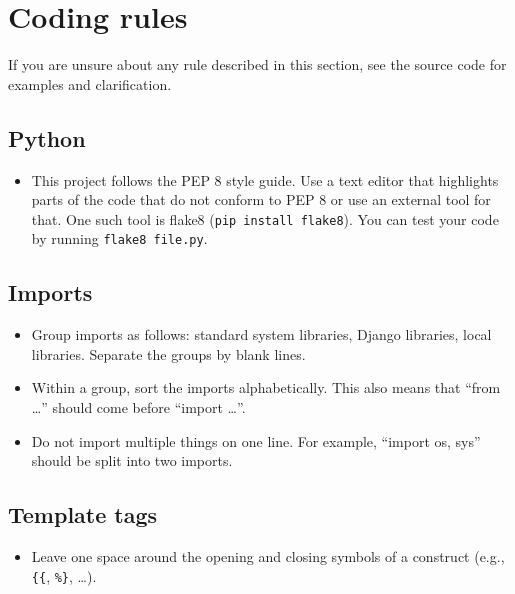 \documentclass{article}
\begin{document}
\section{Coding rules}

If you are unsure about any rule described in this section, see the source code for examples and clarification.

\subsection{Python}

\begin{itemize}
\item This project follows the PEP 8 style guide. Use a text editor that highlights parts of the code that do not conform to PEP 8 or use an external tool for that. One such tool is flake8 (\texttt{pip install flake8}). You can test your code by running \texttt{flake8 file.py}.
\end{itemize}

\subsection{Imports}

\begin{itemize}
\item Group imports as follows: standard system libraries, Django libraries, local libraries. Separate the groups by blank lines.
\item Within a group, sort the imports alphabetically. This also means that ``from \ldots'' should come before ``import \ldots''.
\item Do not import multiple things on one line. For example, ``import os, sys'' should be split into two imports.
\end{itemize}

\subsection{Template tags}

\begin{itemize}
\item Leave one space around the opening and closing symbols of a construct (e.g., \verb+{{+, \verb+%}+, \ldots).
\end{itemize}
\end{document}
